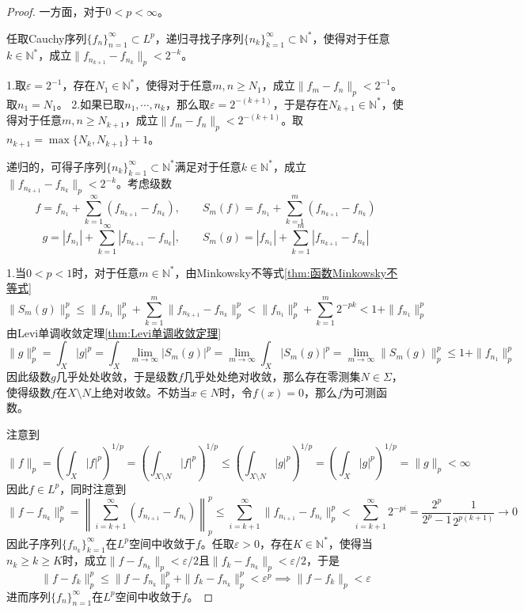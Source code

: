 \documentclass[lang = cn, scheme = chinese, thmcnt = section]{elegantbook}
\newcommand{\N}{\mathbb{N}}            %
\newcommand{\sub}{\subset}             %
\begin{document}
\begin{proof}
	一方面，对于$0<p<\infty$。
	
	任取Cauchy序列$\{f_n\}_{n=1}^\infty\sub L^p$，递归寻找子序列$\{ n_k \}_{k=1}^{\infty}\sub\mathbb{N}^*$，使得对于任意$k\in\mathbb{N}^*$，成立$\| f_{n_{k+1}}-f_{n_k} \|_p<2^{-k}$。
	
	1.取$\varepsilon=2^{-1}$，存在$N_1\in\mathbb{N}^*$，使得对于任意$m,n\ge N_1$，成立$\|f_m-f_n\|_p<2^{-1}$。取$n_1=N_1$。
	2.如果已取$n_1,\cdots,n_k$，那么取$\varepsilon=2^{-(k+1)}$，于是存在$N_{k+1}\in\mathbb{N}^*$，使得对于任意$m,n\ge N_{k+1}$，成立$\|f_m-f_n\|_p<2^{-(k+1)}$。取$n_{k+1}=\max\{ N_{k},N_{k+1} \}+1$。
	
	递归的，可得子序列$\{ n_k \}_{k=1}^{\infty}\sub\mathbb{N}^*$满足对于任意$k\in\mathbb{N}^*$，成立$\| f_{n_{k+1}}-f_{n_k} \|_p<2^{-k}$。考虑级数
	$$
	f=f_{n_1}+\sum_{k=1}^{\infty}(f_{n_{k+1}}-f_{n_k}),\qquad
	S_m(f)=f_{n_1}+\sum_{k=1}^{m}(f_{n_{k+1}}-f_{n_k})
	$$
	$$
	g=|f_{n_1}|+\sum_{k=1}^{\infty}|f_{n_{k+1}}-f_{n_k}|,\qquad
	S_m(g)=|f_{n_1}|+\sum_{k=1}^{m}|f_{n_{k+1}}-f_{n_k}|
	$$
	
	1.当$0<p<1$时，对于任意$m\in\N^*$，由Minkowsky不等式\ref{thm:函数Minkowsky不等式}
	$$
	\|S_m(g)\|_p^p\le \|f_{n_1}\|_p^p+\sum_{k=1}^{m}\| f_{n_{k+1}}-f_{n_k}\|_p^p< \|f_{n_1}\|_p^p+\sum_{k=1}^{m}2^{-pk}<1+\|f_{n_1}\|_p^p
	$$
	由Levi单调收敛定理\ref{thm:Levi单调收敛定理}
	$$
	\|g\|_p^p=\int_X |g|^p=\int_X \lim_{m\to\infty} |S_m(g)|^p=\lim_{m\to\infty}\int_X |S_m(g)|^p=\lim_{m\to\infty}\|S_m(g)\|_p^p\le 1+\|f_{n_1}\|_p^p
	$$
	因此级数$g$几乎处处收敛，于是级数$f$几乎处处绝对收敛，那么存在零测集$N\in\Sigma$，使得级数$f$在$X\setminus N$上绝对收敛。不妨当$x\in N$时，令$f(x)=0$，那么$f$为可测函数。
	
	注意到
	$$
	\|f\|_p
	=\left( \int_{X}|f|^p \right)^{1/p}
	=\left( \int_{X\setminus N}|f|^p \right)^{1/p}
	\le \left( \int_{X\setminus N}|g|^p \right)^{1/p}
	=\left( \int_{X}|g|^p \right)^{1/p}
	=\|g\|_p<\infty
	$$
	因此$f\in L^p$，同时注意到
	$$
	\| f-f_{n_k} \|_p^p
	=\left\| \sum_{i=k+1}^{\infty}(f_{n_{i+1}}-f_{n_i}) \right\|_p^p
	\le \sum_{i=k+1}^{\infty}\| f_{n_{i+1}}-f_{n_i} \|_p^p
	< \sum_{i=k+1}^{\infty}2^{-pi}=\frac{2^p}{2^p-1}\frac{1}{2^{p(k+1)}}\to0
	$$
	因此子序列$\{f_{n_k}\}_{k=1}^{\infty}$在$L^p$空间中收敛于$f$。任取$\varepsilon>0$，存在$K\in\N^*$，使得当$n_k\ge k\ge K$时，成立$\|f-f_{n_k}\|_p<\varepsilon/2$且$\|f_k-f_{n_k}\|_p<\varepsilon/2$，于是
	$$
	\|f-f_k\|_p^p\le\|f-f_{n_k}\|_p^p+\|f_k-f_{n_k}\|_p^p<\varepsilon^p\implies \|f-f_k\|_p<\varepsilon
	$$
	进而序列$\{f_n\}_{n=1}^{\infty}$在$L^p$空间中收敛于$f$。
	

\end{proof}
\end{document}
